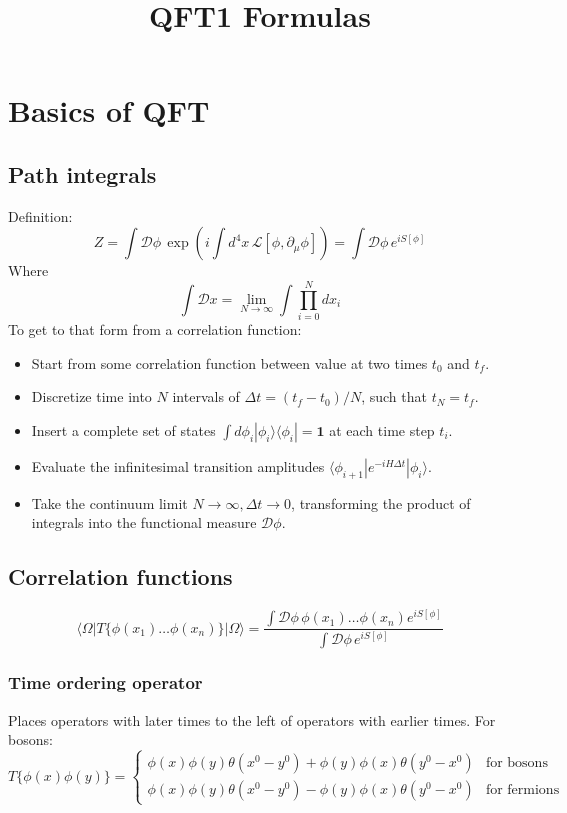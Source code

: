 \documentclass{article}
\title{QFT1 Formulas}
\begin{document}
\maketitle

\section{Basics of QFT}
\subsection{Path integrals}
Definition:
\begin{equation}
    Z = \int \mathcal{D}\phi \, \exp\left( i \int d^4x \, \mathcal{L}[\phi, \partial_\mu\phi] \right) = \int \mathcal{D}\phi \, e^{iS[\phi]}
\end{equation}
Where
\begin{equation}
    \int \mathcal{D} x = \lim_{N\rightarrow\infty} \int \prod_{i=0}^N dx_i
\end{equation}
To get to that form from a correlation function:
\begin{itemize}
    \item Start from some correlation function between value at two times $t_0$ and $t_f$.
    \item Discretize time into $N$ intervals of $\Delta t = (t_f - t_0)/N$, such that $t_N = t_f$.
    \item Insert a complete set of states $\int d\phi_i |\phi_i\rangle \langle\phi_i| = \boldsymbol{1}$ at each time step $t_i$.
    \item Evaluate the infinitesimal transition amplitudes $\langle \phi_{i+1} | e^{-iH\Delta t} | \phi_i \rangle$.
    \item Take the continuum limit $N \to \infty, \Delta t \to 0$, transforming the product of integrals into the functional measure $\mathcal{D}\phi$.
\end{itemize}
\subsection{Correlation functions}
\begin{equation}
    \langle \Omega | T\{\phi(x_1) \dots \phi(x_n)\} | \Omega \rangle = \frac{\int \mathcal{D}\phi \, \phi(x_1) \dots \phi(x_n) e^{iS[\phi]}}{\int \mathcal{D}\phi \, e^{iS[\phi]}}
\end{equation}
\subsubsection*{Time ordering operator}
Places operators with later times to the left of operators with earlier times.
\newline
For bosons:
\begin{equation}
    T\{\phi(x) \phi(y)\} = \begin{cases}
        \phi(x)\phi(y)\theta(x^0 - y^0) + \phi(y)\phi(x)\theta(y^0 - x^0) & \text{for bosons} \\
        \phi(x)\phi(y)\theta(x^0 - y^0) - \phi(y)\phi(x)\theta(y^0 - x^0) & \text{for fermions}
    \end{cases}
\end{equation}
\end{document}
